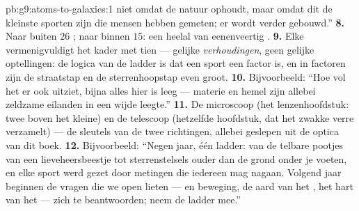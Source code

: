\begin{solution}{pb:g9:atoms-to-galaxies:1}
niet omdat de natuur ophoudt, maar omdat dit de kleinste sporten zijn
die mensen hebben gemeten; er wordt verder gebouwd.''
\textbf{8.} Naar buiten $26$ ; naar binnen $15$: een heelal van
eenenveertig .
\textbf{9.} Elke  vermenigvuldigt het kader met tien --- gelijke
\emph{verhoudingen}, geen gelijke optellingen: de logica van de ladder
is dat een sport een factor is, en in factoren zijn de straatstap en de
sterrenhoopstap even groot.
\textbf{10.} Bijvoorbeeld: ``Hoe vol het er ook uitziet, bijna alles
hier is leeg --- materie en hemel zijn allebei zeldzame eilanden in een
wijde leegte.''
\textbf{11.} De microscoop (het lenzenhoofdstuk: twee
 boven het kleine) en de telescoop (hetzelfde
hoofdstuk, dat het zwakke verre verzamelt) --- de sleutels van de twee
richtingen, allebei geslepen uit de optica van dit boek.
\textbf{12.} Bijvoorbeeld: ``Negen jaar, één ladder: van de telbare
pootjes van een lieveheersbeestje tot sterrenstelsels ouder dan de grond
onder je voeten, en elke sport werd gezet door metingen die iedereen mag
nagaan. Volgend jaar beginnen de vragen die we open lieten ---
 en beweging, de aard van het , het
hart van het  --- zich te beantwoorden; neem de ladder
mee.''
\end{solution}
